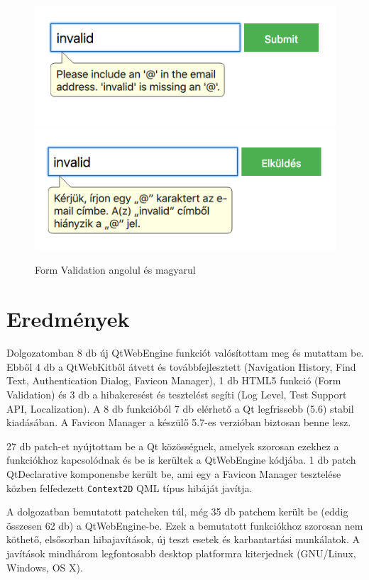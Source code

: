 \documentclass[12pt]{report}
\begin{document}
\begin{figure}[H]
    \centering
    \includegraphics[scale=0.6]{validation-message-english}
    \includegraphics[scale=0.6]{validation-message-magyar}
    \caption{
        \label{fig:validation-message-localization}
        Form Validation angolul és magyarul
    }
\end{figure}


\chapter*{Eredmények}

Dolgozatomban 8 db új QtWebEngine funkciót valósítottam meg és mutattam be. Ebből 4 db a
QtWebKitből átvett és továbbfejlesztett (Navigation History, Find Text, Authentication
Dialog, Favicon Manager), 1 db HTML5 funkció (Form Validation) és 3 db a hibakeresést és
tesztelést segíti (Log Level, Test Support API, Localization). A 8 db funkcióból 7 db
elérhető a Qt legfrissebb (5.6) stabil kiadásában. A Favicon Manager a készülő 5.7-es
verzióban biztosan benne lesz.

27 db patch-et nyújtottam be a Qt közösségnek, amelyek szorosan ezekhez a funkciókhoz
kapcsolódnak és be is kerültek a QtWebEngine kódjába. 1 db patch QtDeclarative komponensbe
került be, ami egy a Favicon Manager tesztelése közben felfedezett \texttt{Context2D}
QML típus hibáját javítja.

A dolgozatban bemutatott patcheken túl, még 35 db patchem került be (eddig összesen 62 db) a
QtWebEngine-be. Ezek a bemutatott funkciókhoz szorosan nem köthető, elsősorban hibajavítások,
új teszt esetek és karbantartási munkálatok. A javítások mindhárom legfontosabb desktop
platformra kiterjednek (GNU/Linux, Windows, OS X).
\end{document}
